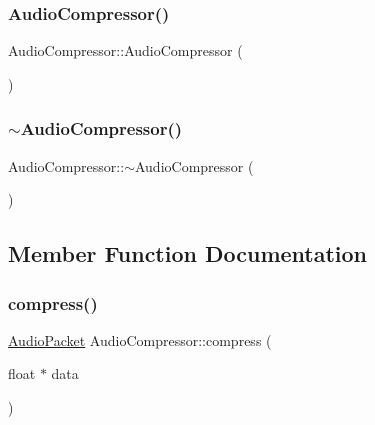 \subsubsection{\texorpdfstring{Audio\+Compressor()}{AudioCompressor()}}
{\footnotesize\ttfamily Audio\+Compressor\+::\+Audio\+Compressor (\begin{DoxyParamCaption}{ }\end{DoxyParamCaption})}

\mbox{\label{classAudioCompressor_abecbb82629c209698ed0e0a91f7a10bb}} 
\subsubsection{\texorpdfstring{$\sim$\+Audio\+Compressor()}{~AudioCompressor()}}
{\footnotesize\ttfamily Audio\+Compressor\+::$\sim$\+Audio\+Compressor (\begin{DoxyParamCaption}{ }\end{DoxyParamCaption})}



\subsection{Member Function Documentation}
\mbox{\label{classAudioCompressor_af7b96e418c01636321cc865a1c90cba3}} 
\subsubsection{\texorpdfstring{compress()}{compress()}}
{\footnotesize\ttfamily \mbox{\hyperlink{structAudioPacket}{Audio\+Packet}} Audio\+Compressor\+::compress (\begin{DoxyParamCaption}\item[{float $\ast$}]{data }\end{DoxyParamCaption})}

\mbox{\label{classAudioCompressor_addeadf7ef44fb753925dbfd6e6aaa005}} 
